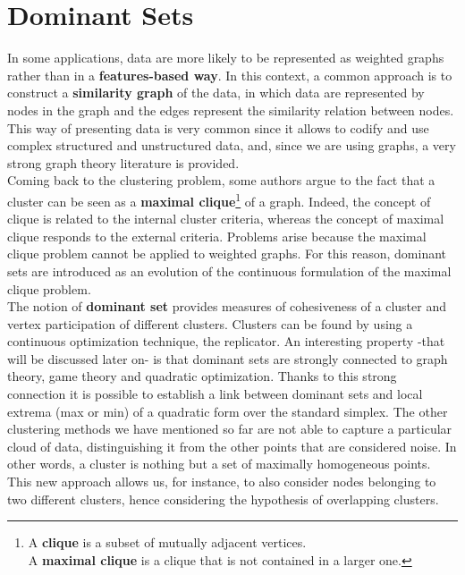 \section{Dominant Sets}
In some applications, data are more likely to be represented as weighted graphs rather than in a \textbf{features-based way}. In this context, a common approach is to construct a \textbf{similarity graph} of the data, in which data are represented by nodes in the graph and the edges represent the similarity relation between nodes. This way of presenting data is very common since it allows to codify and use complex structured and unstructured data, and, since we are using graphs, a very strong graph theory literature is provided.  \\
Coming back to the clustering problem, some authors argue to the fact that a cluster can be seen as a \textbf{maximal clique}\footnote{A \textbf{clique} is a subset of mutually adjacent vertices.\\ A \textbf{maximal clique} is a clique that is not contained in a larger one.} of a graph. Indeed, the concept of clique is related to the internal cluster criteria, whereas the concept of maximal clique responds to the external criteria. Problems arise because the maximal clique problem cannot be applied to weighted graphs. For this reason, dominant sets are introduced as an evolution of the continuous formulation of the maximal clique problem. \\

The notion of \textbf{dominant set} provides measures of cohesiveness of a cluster and vertex participation of different clusters. Clusters can be found by using a continuous optimization technique, the replicator. An interesting property -that will be discussed later on- is that dominant sets are strongly connected to graph theory, game theory and quadratic optimization. Thanks to this strong connection it is possible to establish a link between dominant sets and local extrema (max or min) of a quadratic form over the standard simplex. The other clustering methods we have mentioned so far are not able to capture a particular cloud of data, distinguishing it from the other points that are considered noise. In other words, a cluster is nothing but a set of maximally homogeneous points.
This new approach allows us, for instance, to also consider nodes belonging to two different clusters, hence considering the hypothesis of overlapping clusters.

